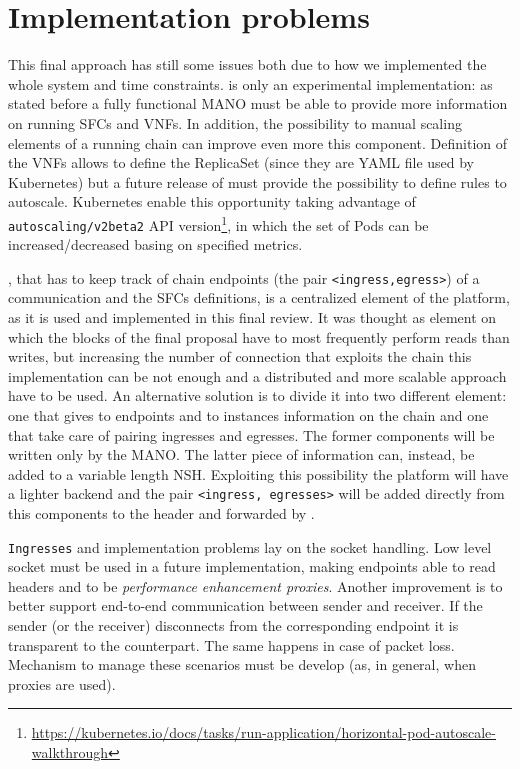 \section{Implementation problems} \label{chap:impl:sec:problems}
This final approach has still some issues both due to how we implemented the
whole system and time constraints. \harbor{} is only an experimental
implementation: as stated before a fully functional MANO must be able to provide
more information on running SFCs and VNFs. In addition, the possibility to
manual scaling elements of a running chain can improve even more this component.
Definition of the VNFs allows to define the ReplicaSet (since they are YAML
file used by Kubernetes) but a future release of \harbor{} must provide
the possibility to define rules to autoscale. Kubernetes enable this
opportunity taking advantage of \texttt{autoscaling/v2beta2} API
version\footnote{\sloppy\url{https://kubernetes.io/docs/tasks/run-application/horizontal-pod-autoscale-walkthrough}},
in which the set of Pods can be increased/decreased basing on specified metrics.

\roulette{}, that has to keep track of chain endpoints (the pair 
\verb!<ingress,egress>!) of a communication and the SFCs definitions, is
a centralized element of the platform, as it is used and implemented in this
final review. It was thought as element on which the blocks of the final
proposal have to most frequently perform reads than writes, but increasing the
number of connection that exploits the chain this implementation can be not
enough and a distributed and more scalable approach have to be used. An
alternative solution is to divide it into two different element: one that gives
to endpoints and to \astaire{} instances information on the chain and one that
take care of pairing ingresses and egresses. The former components will be
written only by the MANO. The latter piece of information can, instead, be added
to a variable length NSH. Exploiting this possibility the platform will have a
lighter backend and the pair \verb!<ingress, egresses>! will be added
directly from this components to the header and forwarded by \astaire{}.

\texttt{Ingresses} and \egresses{} implementation problems lay on the socket
handling. Low level socket must be used in a future implementation, making
endpoints able to read headers and to be \emph{performance enhancement proxies}.
Another improvement is to better support end-to-end communication between sender
and receiver. If the sender (or the receiver) disconnects from the corresponding
endpoint it is transparent to the counterpart. The same happens in case of
packet loss. Mechanism to manage these scenarios must be develop (as, in
general, when proxies are used).

